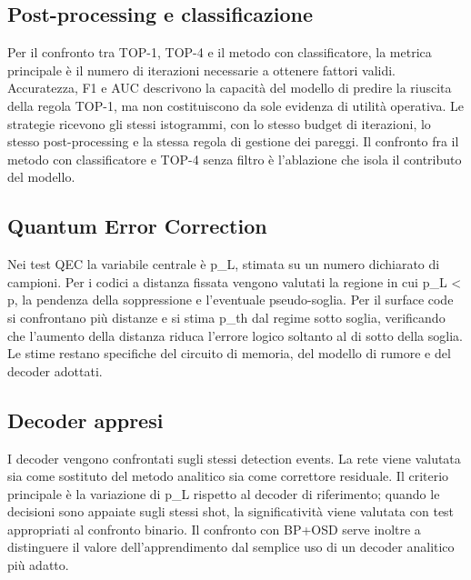 \subsection{Post-processing e classificazione}\label{sec:finale_2_6_1}

Per il confronto tra TOP-1, TOP-4 e il metodo con classificatore, la metrica principale è il numero di iterazioni necessarie a ottenere fattori validi. Accuratezza, F1 e AUC descrivono la capacità del modello di predire la riuscita della regola TOP-1, ma non costituiscono da sole evidenza di utilità operativa. Le strategie ricevono gli stessi istogrammi, con lo stesso budget di iterazioni, lo stesso post-processing e la stessa regola di gestione dei pareggi. Il confronto fra il metodo con classificatore e TOP-4 senza filtro è l'ablazione che isola il contributo del modello. \cite{yang2026}

\subsection{Quantum Error Correction}\label{sec:finale_2_6_2}\label{subsec:metriche_qec}

Nei test QEC la variabile centrale è p\_L, stimata su un numero dichiarato di campioni. Per i codici a distanza fissata vengono valutati la regione in cui p\_L \textless{} p, la pendenza della soppressione e l'eventuale pseudo-soglia. Per il surface code si confrontano più distanze e si stima p\_th dal regime sotto soglia, verificando che l'aumento della distanza riduca l'errore logico soltanto al di sotto della soglia. Le stime restano specifiche del circuito di memoria, del modello di rumore e del decoder adottati. \cite{fowler2012,googleQECBelowThreshold2025,googleSurfaceCode2023,aharonov1997fault,dennis2002topological,calderbankShor1996,gottesman1997}

\subsection{Decoder appresi}\label{sec:finale_2_6_3}

I decoder vengono confrontati sugli stessi detection events. La rete viene valutata sia come sostituto del metodo analitico sia come correttore residuale. Il criterio principale è la variazione di p\_L rispetto al decoder di riferimento; quando le decisioni sono appaiate sugli stessi shot, la significatività viene valutata con test appropriati al confronto binario. Il confronto con BP+OSD serve inoltre a distinguere il valore dell'apprendimento dal semplice uso di un decoder analitico più adatto. \cite{alphaqubit2024,torlaiMelko2017,roffe2020,panteleev2021}

